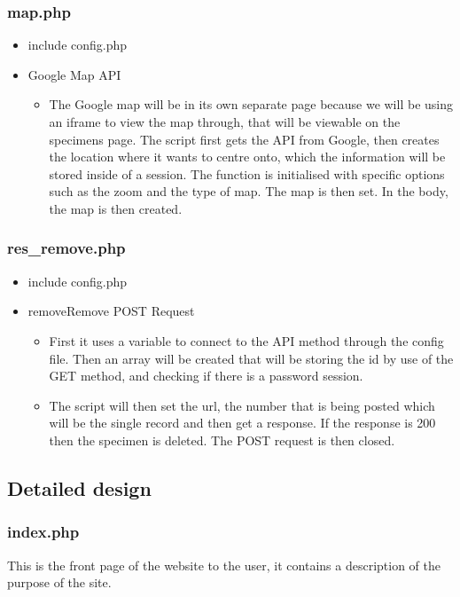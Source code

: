     \subsubsection{map.php}
        \begin{itemize}
            \item include config.php
            \item Google Map API
            \begin{itemize}
                \item The Google map will be in its own separate page because we will be using an iframe to view the map through, that will be viewable on the specimens page. The script first gets the API from Google, then creates the location where it wants to centre onto, which the information will be stored inside of a session. The function is initialised with specific options such as the zoom and the type of map. The map is then set. In the body, the map is then created.
            \end{itemize}
        \end{itemize}

    \subsubsection{res\_remove.php}
        \begin{itemize}
            \item include config.php
            \item removeRemove POST Request
            \begin{itemize}
                \item First it uses a variable to connect to the API method through the config file. Then an array will be created that will be storing the id by use of the GET method, and checking if there is a  password session.
                \item The script will then set the url, the number that is being posted which will be the single record and then get a response. If the response is 200 then the specimen is deleted. The POST request is then closed.
            \end{itemize}
        \end{itemize}

\subsection{Detailed design}

    \subsubsection{index.php}
        This is the front page of the website to the user, it contains a description of the purpose of the site.

